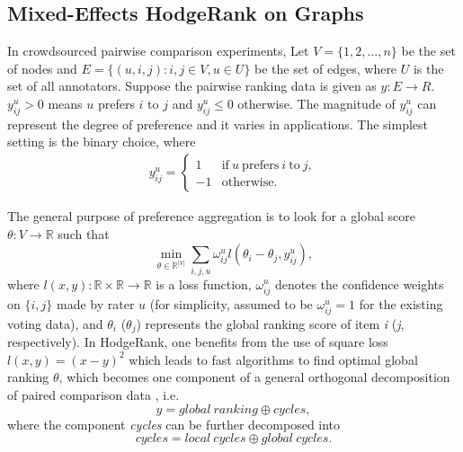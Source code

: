 \documentclass[10pt,journal,cspaper,compsoc]{IEEEtran}
\def\R{{\mathbb R}}        %
\begin{document}
\subsection{Mixed-Effects HodgeRank on Graphs}


In crowdsourced pairwise comparison experiments, Let $V = \{1,2,\dots,n\}$ be the set of nodes and $E = \{(u,i,j): i,j\in V, u \in U\}$ be the set of edges, where $U$ is the set of all annotators. Suppose the pairwise ranking data is given as $y: E\rightarrow R$. $y_{ij}^u>0$ means $u$ prefers $i$ to $j$ and $y_{ij}^{u}\leq 0$ otherwise. The magnitude of $y_{ij}^u$ can represent the degree of preference and it varies in applications. The simplest setting is the binary choice, where
\begin{align}
y_{ij}^u=\left\{\begin{array}{cc}
                                                  1 & \mathrm{if} \ u \ \mathrm{prefers} \ i \ \mathrm{to} \ j, \\
                                                  -1 & \mathrm{otherwise}.
                                                \end{array}
                                                \right.
\label{eq:Y}
\end{align}

%
%

The general purpose of preference aggregation is to look for a global score $\theta\colon V\to \R$ such that
\begin{equation} \label{eq:ho_rank0}
\min_{\theta\in {\mathbb{R}}^{|V|}} \sum_{i,j,u} \omega_{ij}^u l(\theta_i - \theta_j, y_{ij}^u),
\end{equation}
where $l(x,y)\colon \R\times \R\to \R$ is a loss function, $\omega_{ij}^u$ denotes the confidence weights on $\{i,j\}$ made by rater $u$ (for simplicity, assumed to be $\omega_{ij}^u=1$ for the existing voting data), and $\theta_i$ ($\theta_j$) represents the global ranking score of item \emph{i} (\emph{j}, respectively). In HodgeRank, one benefits from the use of square loss $l(x,y)=(x-y)^2$ which leads to fast algorithms to find optimal global ranking $\theta$, which becomes one component of a general orthogonal decomposition of paired comparison data \cite{Hodge}, i.e.
\[ y= global\ ranking \oplus cycles, \]
where the component \emph{cycles} can be further decomposed into
\[cycles = local\ cycles \oplus global\ cycles. \]
\end{document}
